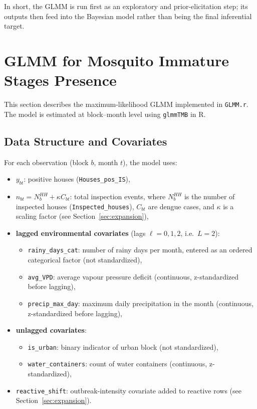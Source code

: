 \documentclass[12pt,a4paper]{article}
\begin{document}
In short, the GLMM is run first as an exploratory and prior-elicitation step; its outputs then feed into the Bayesian model rather than being the final inferential target.

\section{GLMM for Mosquito Immature Stages Presence}

This section describes the maximum-likelihood GLMM implemented in \texttt{GLMM.r}. The model is estimated at block--month level using \texttt{glmmTMB} in R.

\subsection{Data Structure and Covariates}

For each observation (block $b$, month $t$), the model uses:
\begin{itemize}
\item $y_{bt}$: positive houses (\texttt{Houses\_pos\_IS}),
\item $n_{bt} = N_b^{HH} + \kappa C_{bt}$: total inspection events, where $N_b^{HH}$ is the number of inspected houses (\texttt{Inspected\_houses}), $C_{bt}$ are dengue cases, and $\kappa$ is a scaling factor (see Section~\ref{sec:expansion}),
\item \textbf{lagged environmental covariates} (lags $\ell = 0, 1, 2$, i.e.\ $L = 2$):
  \begin{itemize}
    \item \texttt{rainy\_days\_cat}: number of rainy days per month, entered as an ordered categorical factor (not standardized),
    \item \texttt{avg\_VPD}: average vapour pressure deficit (continuous, z-standardized before lagging),
    \item \texttt{precip\_max\_day}: maximum daily precipitation in the month (continuous, z-standardized before lagging),
  \end{itemize}
\item \textbf{unlagged covariates}:
  \begin{itemize}
    \item \texttt{is\_urban}: binary indicator of urban block (not standardized),
    \item \texttt{water\_containers}: count of water containers (continuous, z-standardized),
  \end{itemize}
\item \texttt{reactive\_shift}: outbreak-intensity covariate added to reactive rows (see Section~\ref{sec:expansion}).
\end{itemize}
\end{document}

